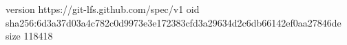 version https://git-lfs.github.com/spec/v1
oid sha256:6d3a37d03a4c782c0d9973e3e172383cfd3a29634d2c6db66142ef0aa27846de
size 118418
